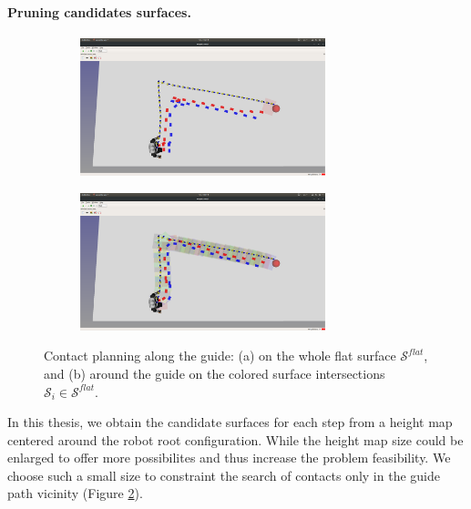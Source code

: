 \paragraph{Pruning candidates surfaces.\label{subsub:mip:discussion:candidate_surfaces}}
\begin{figure}[t]
    \centering
    \captionsetup[subfigure]{justification=centering}
    \begin{subfigure}[t]{0.48\linewidth}
    \includegraphics[trim={15cm 4cm 10cm 9cm},clip,width=\textwidth,height=4cm]{Figures/Chapter_MIP_SL1M/flat_candidate_surf/ground_guide_uncontrained.png}
    \caption{}
    \label{fig:mip:flat:unconstrained}
    \end{subfigure}
    \begin{subfigure}[t]{0.48\linewidth}
    \includegraphics[trim={15cm 4cm 10cm 9cm},clip,width=\textwidth,height=4cm]{Figures/Chapter_MIP_SL1M/flat_candidate_surf/ground_guide_contrained.png}
    \caption{}
    \label{fig:mip:flat:constrained}
    \end{subfigure}
    \caption{Contact planning along the guide: (a) on the whole flat surface $\mathcal{S}^{flat}$, and (b) around the guide on the colored surface intersections $\mathcal{S}_i \in \mathcal{S}^{flat}$.}
    \label{fig:mip:flat:constrained_or_not}
\end{figure}
In this thesis, we obtain the candidate surfaces for each step from a height map centered around the robot root configuration. While the height map size could be enlarged to offer more possibilites and thus increase the problem feasibility.
We choose such a small size to constraint the search of contacts only in the guide path vicinity (Figure \ref{fig:mip:flat:constrained}).


